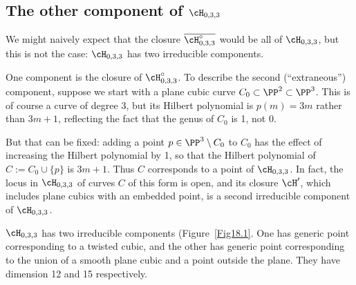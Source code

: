 \subsection{The other component of \texorpdfstring{$\cH_{0,3,3}$}{$H_{0,3,3}_$}}

We might naively expect that the closure $\overline{\cH^\circ_{0,3,3}}$ would be all of $\cH_{0,3,3}$, but this is not the case:  $\cH_{0,3,3}$ has two irreducible components. 

One component is the closure of $\cH^\circ_{0,3,3}$. To describe the second (``extraneous'') component, suppose we start with a plane cubic curve $C_0 \subset \PP^2 \subset \PP^3$. This is of course a curve of degree 3, but its Hilbert polynomial is $p(m) = 3m$ rather than $3m+1$, reflecting the fact that the genus of $C_0$ is 1, not 0.

But that can be fixed: adding a point $p \in \PP^3 \setminus C_0$ to $C_0$ has the effect of increasing the Hilbert polynomial by 1, so that the Hilbert polynomial of $C := C_0\cup \{p\}$ is $3m+1$. Thus $C$  corresponds to a point of $\cH_{0,3,3}$. In fact, the locus in $\cH_{0,3,3}$ of curves $C$ of this form is open, and its closure $\cH'$, which includes plane cubics with an embedded point, is a second irreducible component of $\cH_{0,3,3}$. 


\begin{theorem}
$\cH_{0,3,3}$ has two irreducible components (Figure~\ref{Fig18.1}. One has generic point corresponding to  a twisted cubic,
and the other has generic point corresponding to the union of a smooth plane cubic and a point outside the plane.
They have dimension 12 and 15 respectively.
\end{theorem}

